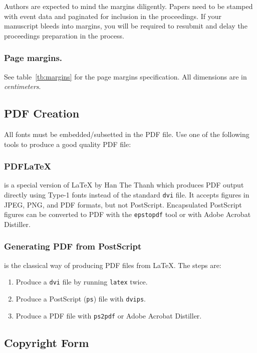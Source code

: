 Authors are expected to mind the margins diligently.  Papers need to
be stamped with event data and paginated for inclusion in the
proceedings. If your manuscript bleeds into margins, you will be
required to resubmit and delay the proceedings preparation in the
process.

\subsubsection{Page margins.} See table~\ref{tb:margins} for the
page margins specification. All dimensions are in \emph{centimeters}.


\subsection{PDF Creation}

All fonts must be embedded/subsetted in the PDF file. Use one of the
following tools to produce a good quality PDF file:

\subsubsection{PDFLaTeX} is a special version of LaTeX by Han The
Thanh which produces PDF output directly using Type-1 fonts instead of
the standard \texttt{dvi} file. It accepts figures in JPEG, PNG, and PDF
formats, but not PostScript. Encapsulated PostScript figures can be
converted to PDF with the \texttt{epstopdf} tool or with Adobe Acrobat
Distiller.

\subsubsection{Generating PDF from PostScript} is the classical way of
producing PDF files from LaTeX. The steps are:

\begin{enumerate}
  \item Produce a \texttt{dvi} file by running \texttt{latex} twice.
  \item Produce a PostScript (\texttt{ps}) file with \texttt{dvips}.
  \item Produce a PDF file with \texttt{ps2pdf} or Adobe Acrobat
  Distiller.
\end{enumerate}

\subsection{Copyright Form}

